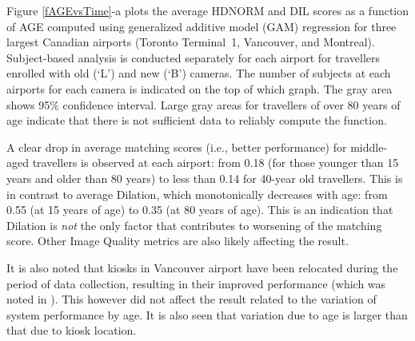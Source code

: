 \documentclass{cta-author}%
\begin{document}


Figure \ref{fAGEvsTime}-a %
plots the average HDNORM and  DIL scores as a function of AGE computed using generalized additive model (GAM) regression
\cite{R-book} for   three largest Canadian airports (Toronto Terminal~1, Vancouver, and Montreal).
Subject-based analysis is conducted separately for each airport for travellers enrolled with old (`L') and new (`B') cameras.
The number of subjects at each airports for each camera is indicated on the top of which graph.
The gray area shows 95\% confidence interval. 
Large gray areas for travellers of over 80 years of age indicate that there is not sufficient data to reliably compute the function.

A clear drop in average matching scores (i.e., better performance) for middle-aged travellers is observed at each airport: from 0.18 (for those younger than 15 years  and older than 80 years) to less than 0.14 for 40-year old travellers.
This is in contrast to average Dilation, which monotonically decreases with age: from 0.55 (at 15 years of age)  to 0.35 (at 80 years of age).
This is an indication that Dilation is \textit{not} the only factor that contributes to worsening of the matching score. 
Other Image Quality metrics are also likely affecting the result.

It is also noted that kiosks in Vancouver airport have been relocated during the period of data collection, resulting  in their improved performance (which was noted in \cite{Bowyer-BTAS2016}). This however did not affect the result related to the variation of system performance by age.
It is also seen that variation due to age  is larger than that due to kiosk location.
\end{document}
